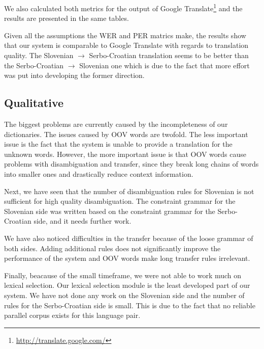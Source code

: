 We also calculated both metrics for the output of Google Translate\footnote{\url{http://translate.google.com/}} 
and the results are presented in the same tables. 

Given all the assumptions the WER and PER matrics make, the results show that our system is comparable to Google Translate
with regards to translation quality. The Slovenian $\rightarrow$ Serbo-Croatian translation seems to be better than the Serbo-Croatian $\rightarrow$ Slovenian one
which is due to the fact that more effort was put into developing the former direction.



\subsection{Qualitative}
The biggest problems are currently caused by the incompleteness of our dictionaries.
The issues caused by OOV words are twofold.
The less important issue is the fact that the system is unable to provide a translation for the unknown words. 
However, the more important issue is that OOV words cause problems with disambiguation and transfer, since they
break long chains of words into smaller ones and drastically reduce context information. 

Next, we have seen that the number of disambiguation rules for Slovenian is not sufficient for high quality disambiguation. 
The constraint grammar for the Slovenian side was written based on the constraint grammar for the Serbo-Croatian side,
and it needs further work.

We have also noticed difficulties in the transfer because of the loose grammar of both sides.
Adding additional rules does not significantly improve the performance of the system 
and OOV words make long transfer rules irrelevant.

Finally, beacause of the small timeframe, we were not able to work much on lexical selection.
Our lexical selection module is the least developed part of our system. 
We have not done any work on the Slovenian side and the number of rules for the Serbo-Croatian side is small.
This is due to the fact that no reliable parallel corpus exists for this language pair.



